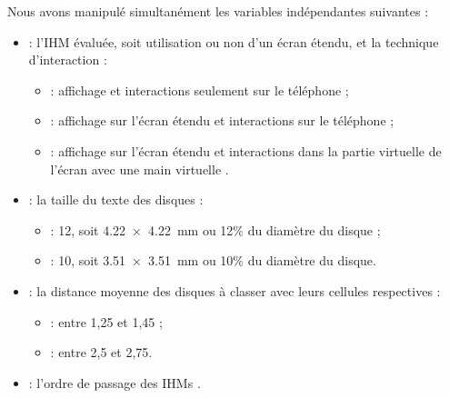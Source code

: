 
Nous avons manipulé simultanément les variables indépendantes suivantes :
\begin{itemize}
  \item {} : l'IHM évaluée, soit utilisation ou non d'un écran étendu, et la technique d'interaction :
  \begin{itemize}
    \item {} : affichage et interactions seulement sur le téléphone  ;
    \item {} : affichage sur l'écran étendu et interactions sur le téléphone  ;
    \item {} : affichage sur l'écran étendu et interactions dans la partie virtuelle de l'écran avec une main virtuelle .
  \end{itemize}
  \item {} : la taille du texte des disques :
  \begin{itemize}
    \item {} : \SI{12}{\pt}, soit \SI{4.22x4.22}{\mm} ou 12\% du diamètre du disque ;
    \item {} : \SI{10}{\pt}, soit \SI{3.51x3.51}{\mm} ou 10\% du diamètre du disque.
  \end{itemize}
  \item {} : la distance moyenne des disques à classer avec leurs cellules respectives :
  \begin{itemize}
    \item {} : entre 1,25 et 1,45 ;
    \item {} : entre 2,5 et 2,75.
  \end{itemize}
  \item {} : l'ordre de passage des IHMs .
\end{itemize}
\medskip

